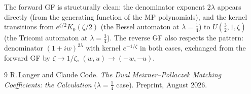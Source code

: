 \documentclass[11pt,a4paper]{article}
\begin{document}
The forward GF is structurally clean: the denominator exponent $2\lambda$ appears directly
(from the generating function of the MP polynomials), and the kernel transitions from
$e^{\zeta/2} K_0(\zeta/2)$ (the Bessel automaton at $\lambda = \tfrac14$) to
$U(\tfrac32, 1, \zeta)$ (the Tricomi automaton at $\lambda = \tfrac34$). The reverse GF
also respects the pattern: denominator $(1+iw)^{2\lambda}$ with kernel $e^{-1/\zeta}$
in both cases, exchanged from the forward GF by $\zeta \to 1/\zeta$, $(w,u) \to (-w,-u)$.

\begin{thebibliography}{9}
R.\,Langer and Claude Code.
\textit{The Dual Meixner--Pollaczek Matching Coefficients: the Calculation}
($\lambda = \tfrac14$ case).
Preprint, August 2026.
\end{thebibliography}
\end{document}
